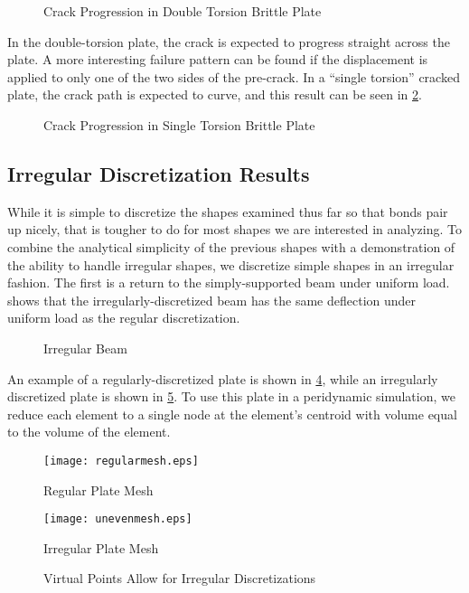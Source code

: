 %
\begin{figure}[tbhp]
  \centering
  \resizebox{0.6\linewidth}{!}{}
  \caption{Crack Progression in Double Torsion Brittle Plate}
  \label{fig:DTdamage}
\end{figure}
%
In the double-torsion plate, the crack is expected to progress straight across the plate.
A more interesting failure pattern can be found if the displacement is applied to only one of the two sides of the pre-crack.
In a ``single torsion'' cracked plate, the crack path is expected to curve, and this result can be seen in \cref{fig:SingleTorsion}.
%
\begin{figure}[tbhp]
  \centering
  \resizebox{0.6\linewidth}{!}{}
  \caption{Crack Progression in Single Torsion Brittle Plate}
  \label{fig:SingleTorsion}
\end{figure}
%

\FloatBarrier
\subsection{Irregular Discretization Results}
While it is simple to discretize the shapes examined thus far so that bonds pair up nicely, that is tougher to do for most shapes we are interested in analyzing.
To combine the analytical simplicity of the previous shapes with a demonstration of the ability to handle irregular shapes, we discretize simple shapes in an irregular fashion.
The first is a return to the simply-supported beam under uniform load.
 shows that the irregularly-discretized beam has the same deflection under uniform load as the regular discretization.
%
\begin{figure}[tbhp]
  \centering
  \resizebox{0.6\linewidth}{!}{}
  \caption{Irregular Beam}
  \label{fig:BeamIrreg}
\end{figure}
%

An example of a regularly-discretized plate is shown in \cref{fig:regularmesh}, while an irregularly discretized plate is shown in \cref{fig:unevenmesh}.
To use this plate in a peridynamic simulation, we reduce each element to a single node at the element's centroid with volume equal to the volume of the element.
%
\begin{figure}[h]
  \centering
  \texttt{[image: regularmesh.eps]}
  \caption{Regular Plate Mesh}
  \label{fig:regularmesh}
\end{figure}
%
%
\begin{figure}[h]
  \centering
  \texttt{[image: unevenmesh.eps]}
  \caption{Irregular Plate Mesh}
  \label{fig:unevenmesh}
\end{figure}
%
%
\begin{figure}[tbhp]
  \centering
  \resizebox{0.6\linewidth}{!}{}
  \caption{Virtual Points Allow for Irregular Discretizations}
  \label{fig:PlateIrreg}
\end{figure}
%

